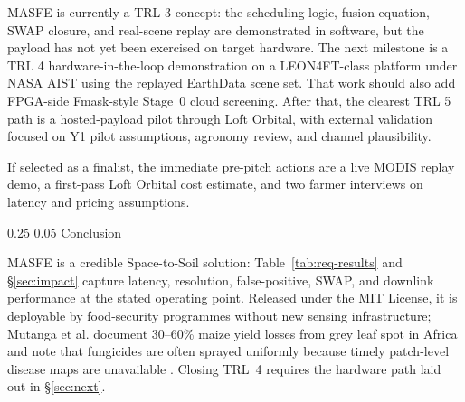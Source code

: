 \documentclass[11pt,letterpaper]{article}
\makeatletter
\renewcommand\section{\@startsection{section}{1}{\z@}
  {0.25\baselineskip}
  {0.05\baselineskip}
  {\normalfont\large\bfseries}}
\makeatother
\begin{document}
MASFE is currently a TRL 3 concept: the scheduling logic, fusion equation, SWAP closure, and real-scene replay are demonstrated in software, but the payload has not yet been exercised on target hardware. The next milestone is a TRL 4 hardware-in-the-loop demonstration on a LEON4FT-class platform under NASA AIST using the replayed EarthData scene set. That work should also add FPGA-side Fmask-style Stage~0 cloud screening. After that, the clearest TRL 5 path is a hosted-payload pilot through Loft Orbital, with external validation focused on Y1 pilot assumptions, agronomy review, and channel plausibility.

If selected as a finalist, the immediate pre-pitch actions are a live MODIS replay demo, a first-pass Loft Orbital cost estimate, and two farmer interviews on latency and pricing assumptions.


\section{Conclusion}

\label{chapter:conclusion}

MASFE is a credible Space-to-Soil solution: Table~\ref{tab:req-results} and \S\ref{sec:impact} capture latency, resolution, false-positive, SWAP, and downlink performance at the stated operating point. Released under the MIT License, it is deployable by food-security programmes without new sensing infrastructure; Mutanga et al. document 30--60\% maize yield losses from grey leaf spot in Africa and note that fungicides are often sprayed uniformly because timely patch-level disease maps are unavailable \cite{chemura-africa}. Closing TRL~4 requires the hardware path laid out in \S\ref{sec:next}.

\clearpage
\begingroup
\normalsize
{}
\setlength{\parskip}{0pt}
\setlength{\itemsep}{0pt}
\setlength{\parsep}{0pt}
\sloppy


\endgroup
\end{document}
